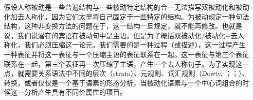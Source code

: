 假设人称被动是一些普遍结构与一些被动特定结构的合一无法描写双被动化和被动化加去人称化，因为它们太早将自己固定于一些特定的结构。为被动规定一种句法结构，这种非变换方法的问题在于，这一结构一旦规定，就不能再修改。也就是说，我们说潜在的宾语在被动句中是主语。但是为了概括双被动化/被动化+去人称化，我们必须压缩这一论元。我们需要的是一种过程（或描述），这一过程产生一种表征并将这一表征与一个压缩主语的表征联系在一起。这一表征与第三个表征联系在一起，第三个表征再一次压缩了主语，产生一个去人称句子。为了实现这一点，就需要关系语法\citep{Timberlake82a,Ozkaragoez86a}中不同的层次（strata）、元规则\citep*{GKPS85a}、词汇规则（Dowty, \citeyear[]{Dowty78a}；\citeyear[\S~3.4]{Dowty2003a}；\citealt{Bresnan82a,ps,Blevins2003a,Mueller2003e}）、转换\citep{Chomsky57a}，或者仅仅是一个基于语素的形态分析，当被动化语素与一个中心词组合的时候这一分析产生具有不同价属性的项目\citep{Chomsky81a}。

